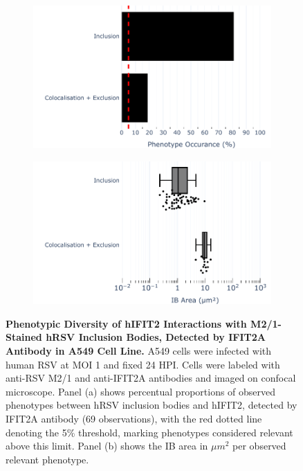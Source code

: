 \begin{figure}
    \begin{subfigure}{0.495\textwidth}
        \caption{}
        \includegraphics[width=1\linewidth]{08. Chapter 3/Figs/02. Infection/02. IFIT2/01. IFIT2A/07. bar_i2a_a549-m21.pdf} 
    \end{subfigure}
    \begin{subfigure}{0.495\textwidth}
        \caption{}
        \includegraphics[width=1\linewidth]{08. Chapter 3/Figs/02. Infection/02. IFIT2/01. IFIT2A/08. box_i2a_a549-m21.pdf}
    \end{subfigure}
    \caption[Phenotypic Diversity of hIFIT2 Interactions with M2/1-Stained hRSV Inclusion Bodies, Detected by IFIT2A Antibody in A549 Cell Line.]{\textbf{Phenotypic Diversity of hIFIT2 Interactions with M2/1-Stained hRSV Inclusion Bodies, Detected by IFIT2A Antibody in A549 Cell Line.} A549 cells were infected with human RSV at MOI 1 and fixed 24 HPI. Cells were labeled with anti-RSV M2/1 and anti-IFIT2A antibodies and imaged on confocal microscope. Panel (a) shows percentual proportions of observed phenotypes between hRSV inclusion bodies and hIFIT2, detected by IFIT2A antibody (69 observations), with the red dotted line denoting the 5\% threshold, marking phenotypes considered relevant above this limit. Panel (b) shows the IB area in \(\mu m^2\) per observed relevant phenotype.}
    \label{fig:Phenotypic Diversity of hIFIT2 Interactions with M2/1-Stained hRSV Inclusion Bodies, Detected by IFIT2A Antibody in A549 Cell Line}
\end{figure}

